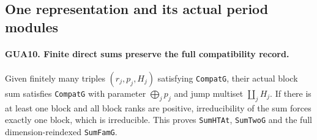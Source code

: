 \subsection{One representation and its actual period modules}

\paragraph{GUA10. Finite direct sums preserve the full compatibility record.}
\label{claim:GUA10}
Given finitely many triples $(r_j,p_j,H_j)$ satisfying
\texttt{CompatG}, their actual block sum satisfies
\texttt{CompatG} with parameter $\bigoplus_jp_j$
and jump multiset $\coprod_jH_j$.  If there is at least
one block and all block ranks are positive, irreducibility
of the sum forces exactly one block, which is irreducible.
This proves \texttt{SumHTAt}, \texttt{SumTwoG} and
the full dimension-reindexed \texttt{SumFamG}.
